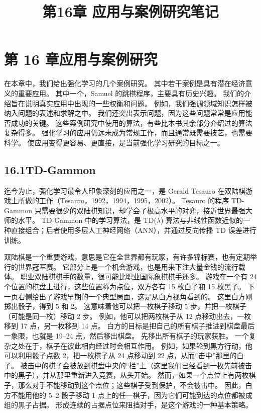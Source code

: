\documentclass[UTF8,12pt,a4paper,fontset=fandol]{ctexart}
\title{第16章 应用与案例研究笔记}
\author{}
\date{}
\begin{document}
\maketitle

\section*{第 16 章\quad 应用与案例研究}

在本章中，我们给出强化学习的几个案例研究。
其中若干案例是具有潜在经济意义的重要应用。
其中一个，Samuel 的跳棋程序，主要具有历史兴趣。
我们的介绍旨在说明真实应用中出现的一些权衡和问题。
例如，我们强调领域知识怎样被纳入问题的表述和求解之中。
我们还突出表示问题，因为这些问题常常是应用能否成功的关键。
这些案例研究中使用的算法，有些比本书其余部分介绍过的算法复杂得多。
强化学习的应用仍远未成为常规工作，而且通常既需要技艺，也需要科学。
使应用变得更容易、更直接，是当前强化学习研究的目标之一。

\subsection*{16.1\quad TD-Gammon}

迄今为止，强化学习最令人印象深刻的应用之一，是 Gerald Tesauro 在双陆棋游戏上所做的工作（Tesauro，1992，1994，1995，2002）。
Tesauro 的程序 TD-Gammon 只需要很少的双陆棋知识，却学会了极高水平的对弈，接近世界最强大师的水平。
TD-Gammon 中的学习算法，是 TD($\lambda$) 算法与非线性函数近似的一种直接组合；后者使用多层人工神经网络（ANN），并通过反向传播 TD 误差进行训练。

双陆棋是一个重要游戏，意思是它在全世界都有玩家，有许多锦标赛，也有定期举行的世界冠军赛。
它部分上是一个机会游戏，也是用来下注大量金钱的流行载体。
职业双陆棋棋手的数量，很可能比职业国际象棋棋手还多。
游戏在一个有 24 个位置的棋盘上进行，这些位置称为点位，双方各有 15 枚白子和 15 枚黑子。
下一页右侧给出了游戏早期的一个典型局面，这是从白方视角看到的。
这里白方刚掷出骰子，得到 5 和 2。
这意味着他可以把一枚棋子移动 5 步，并把一枚棋子（可能是同一枚）移动 2 步。
例如，他可以把两枚棋子从 12 点移动出去，一枚移到 17 点，另一枚移到 14 点。
白方的目标是把自己的所有棋子推进到棋盘最后一象限，也就是 19--24 点，然后移出棋盘。
先移出所有棋子的玩家获胜。
一个复杂之处在于，棋子在彼此相向经过时会相互作用。
例如，如果轮到黑方行动，他可以利用骰子点数 2，把一枚棋子从 24 点移动到 22 点，从而“击中”那里的白子。
被击中的棋子会被放到棋盘中央的“栏”上（这里我们已经看到一枚先前被击中的黑子），并从那里重新进入竞赛，从头开始。
然而，如果一个点位上有两枚棋子，那么对手不能移动到这个点位；这些棋子受到保护，不会被击中。
因此，白方不能用他的 5--2 骰子移动 1 点上的任一棋子，因为它们可能到达的点位都被成组的黑子占据。
形成连续的占据点位来阻挡对手，是这个游戏的一种基本策略。
\end{document}
